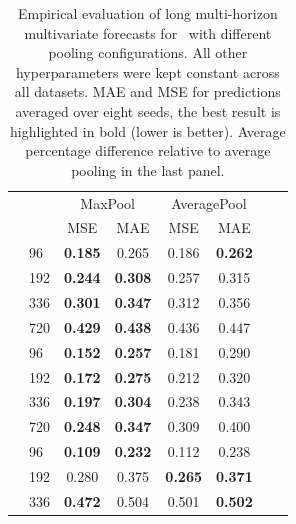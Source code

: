 \begin{table}[!ht] %
\scriptsize
    \begin{center}
    \caption{Empirical evaluation of long multi-horizon multivariate forecasts for \ours\ with different pooling configurations. All other hyperparameters were kept constant across all datasets. MAE and MSE for predictions averaged over eight seeds, the best result is highlighted in bold (lower is better). Average percentage difference relative to average pooling in the last panel.}
    \label{table:ablation_pooling}
	\begin{tabular}{ll | cccccc} \toprule
    						        &     & \multicolumn{2}{c}{MaxPool}  & \multicolumn{2}{c}{AveragePool}        \\
    						        &     & MSE             & MAE             & MSE            & MAE              \\ \midrule
\parbox[t]{1mm}{}
									& 96  & \textbf{0.185}  & 0.265           & 0.186          & \textbf{0.262}   \\
									& 192 & \textbf{0.244}  & \textbf{0.308}  & 0.257          & 0.315            \\
									& 336 & \textbf{0.301}  & \textbf{0.347}  & 0.312          & 0.356            \\
									& 720 & \textbf{0.429}  & \textbf{0.438}  & 0.436          & 0.447            \\ \midrule
\parbox[t]{1mm}{}
									& 96  & \textbf{0.152}  & \textbf{0.257}  & 0.181          & 0.290            \\
									& 192 & \textbf{0.172}  & \textbf{0.275}  & 0.212          & 0.320            \\
									& 336 & \textbf{0.197}  & \textbf{0.304}  & 0.238          & 0.343            \\
									& 720 & \textbf{0.248}  & \textbf{0.347}  & 0.309          & 0.400            \\ \midrule
\parbox[t]{1mm}{}
									& 96  & \textbf{0.109}  & \textbf{0.232}  & 0.112          & 0.238            \\
									& 192 & 0.280           & 0.375           & \textbf{0.265} & \textbf{0.371}   \\
									& 336 & \textbf{0.472}  & 0.504           & 0.501          & \textbf{0.502}   \\

\end{tabular}
\end{center}
\end{table}
